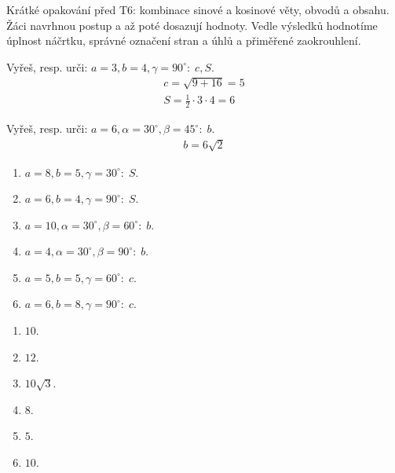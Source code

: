 \documentclass[11pt,a4paper]{article}
\begin{document}
Krátké opakování před T6: kombinace sinové a kosinové věty, obvodů a obsahu. Žáci navrhnou postup a až poté dosazují hodnoty.
Vedle výsledků hodnotíme úplnost náčrtku, správné označení stran a úhlů a přiměřené zaokrouhlení.
\begin{prikladReseniBox}[title={Příklad 1}]
Vyřeš, resp. urči: $a=3,b=4,\gamma=90^\circ:\;c,S$.
\tcblower
\[\begin{aligned}c=\sqrt{9+16}=5 \\ S=\frac{1}{2}\cdot3\cdot4=6\end{aligned}\]
\end{prikladReseniBox}
\begin{prikladReseniBox}[title={Příklad 2}]
Vyřeš, resp. urči: $a=6,\alpha=30^\circ,\beta=45^\circ:\;b$.
\tcblower
\[\begin{aligned}b=6\sqrt2\end{aligned}\]
\end{prikladReseniBox}
\begin{zadaniReseniBox}[title={Samostatná práce 1}]
\begin{enumerate}[label=\alph*)]
\item $a=8,b=5,\gamma=30^\circ:\;S$.
\item $a=6,b=4,\gamma=90^\circ:\;S$.
\item $a=10,\alpha=30^\circ,\beta=60^\circ:\;b$.
\item $a=4,\alpha=30^\circ,\beta=90^\circ:\;b$.
\item $a=5,b=5,\gamma=60^\circ:\;c$.
\item $a=6,b=8,\gamma=90^\circ:\;c$.
\end{enumerate}
\tcblower
\begin{enumerate}[label=\alph*)]
\item $10$.
\item $12$.
\item $10\sqrt3$.
\item $8$.
\item $5$.
\item $10$.
\end{enumerate}
\end{zadaniReseniBox}
\end{document}
